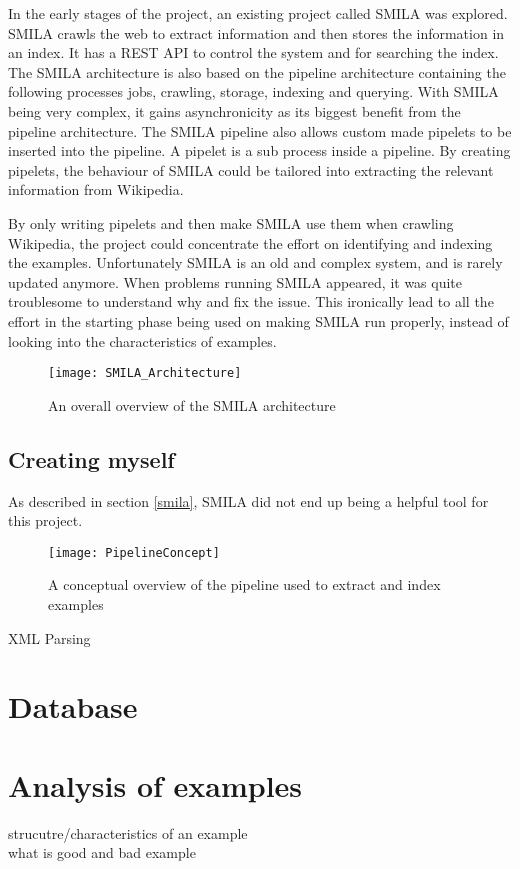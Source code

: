 In the early stages of the project, an existing project called SMILA was explored. SMILA crawls the web to extract information and then stores the information in an index. It has a REST API to control the system and for searching the index. The SMILA architecture is also based on the pipeline architecture containing the following processes jobs, crawling, storage, indexing and querying. With SMILA being very complex, it gains asynchronicity as its biggest benefit from the pipeline architecture. The SMILA pipeline also allows custom made pipelets to be inserted into the pipeline. A pipelet is a sub process inside a pipeline. By creating pipelets, the behaviour of SMILA could be tailored into extracting the relevant information from Wikipedia.

By only writing pipelets and then make SMILA use them when crawling Wikipedia, the project could concentrate the effort on identifying and indexing the examples. Unfortunately SMILA is an old and complex system, and is rarely updated anymore. When problems running SMILA appeared, it was quite troublesome to understand why and fix the issue. This ironically lead to all the effort in the starting phase being used on making SMILA run properly, instead of looking into the characteristics of examples. 

\begin{figure}[h]
\caption{An overall overview of the SMILA architecture}
\texttt{[image: SMILA\_Architecture]}
\end{figure}

\subsection{Creating myself}

As described in section \ref{smila}, SMILA did not end up being a helpful tool for this project.

\begin{figure}[h]
\caption{A conceptual overview of the pipeline used to extract and index examples}
\texttt{[image: PipelineConcept]}
\end{figure}


XML Parsing

\section{Database}

\section{Analysis of examples}
strucutre/characteristics of an example\\
what is good and bad example

\cleardoublepage